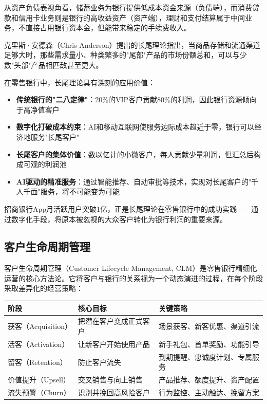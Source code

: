 从资产负债表视角看，储蓄业务为银行提供低成本资金来源（负债端），而消费贷款和信用卡业务则是银行的高收益资产（资产端），理财和支付结算属于中间业务，不直接占用银行资本金，但能带来稳定的手续费收入。

\begin{theorybox}[长尾理论在零售银行中的应用]
克里斯·安德森（Chris Anderson）提出的长尾理论指出，当商品存储和流通渠道足够大时，那些需求量小、种类繁多的"尾部"产品的市场份额总和，可以与少数"头部"产品相匹敌甚至更大。

在零售银行中，长尾理论具有深刻的应用价值：
\begin{itemize}[leftmargin=2em]
  \item \textbf{传统银行的"二八定律"}：20\%的VIP客户贡献80\%的利润，因此银行资源倾向于高净值客户
  \item \textbf{数字化打破成本约束}：AI和移动互联网使服务边际成本趋近于零，银行可以经济地服务"长尾客户"
  \item \textbf{长尾客户的集体价值}：数以亿计的小微客户，每人贡献少量利润，但汇总后构成可观的利润池
  \item \textbf{AI驱动的精准服务}：通过智能推荐、自动审批等技术，实现对长尾客户的"千人千面"服务，将不可能变为可能
\end{itemize}

招商银行App月活跃用户突破1亿，正是长尾理论在零售银行中的成功实践——通过数字化手段，将原本被忽视的大众客户转化为银行利润的重要来源。
\end{theorybox}

\subsection{客户生命周期管理}

客户生命周期管理（Customer Lifecycle Management, CLM）是零售银行精细化运营的核心方法论。它将客户与银行的关系视为一个动态演进的过程，在每个阶段采取差异化的经营策略：

\begin{table}[H]
\centering
\begin{tabular}{lp{4cm}p{5cm}}
\toprule
\textbf{阶段} & \textbf{核心目标} & \textbf{关键策略} \\
\midrule
获客（Acquisition） & 把潜在客户变成正式客户 & 场景获客、新客优惠、渠道引流 \\
活客（Activation） & 让新客户开始使用产品 & 新手礼包、首单奖励、功能引导 \\
留客（Retention） & 防止客户流失 & 到期提醒、忠诚度计划、专属服务 \\
价值提升（Upsell） & 交叉销售与向上销售 & 产品推荐、额度提升、资产配置 \\
流失预警（Churn） & 识别并挽回高风险客户 & 行为监控、主动触达、挽留方案 \\
\bottomrule
\end{tabular}
\end{table}

